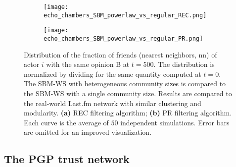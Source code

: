 \documentclass[11 pt , letterpaper , twoside , openright]{book}
\begin{document}
\begin{figure}[H]
  \begin{subfigure}[b]{0.49\textwidth}
    \caption{}
  	\texttt{[image: echo\_chambers\_SBM\_powerlaw\_vs\_regular\_REC.png]}
    \label{pr_pow_single}
  \end{subfigure}
  \begin{subfigure}[b]{0.49\textwidth}
    \caption{}
  	\texttt{[image: echo\_chambers\_SBM\_powerlaw\_vs\_regular\_PR.png]}
    \label{rec_pow_single}
  \end{subfigure}
  \captionsetup{format=plain}
  \caption[Distribution of the fraction of friends (nearest neighbors, nn) of actor $i$ with the same opinion B at $t = 500$. The SBM-WS with heterogeneous community sizes is compared to the SBM-WS with a single community size. Results are compared to the real-world Last.fm network with similar clustering and modularity. Results for the REC and PR filtering algorithms.]{Distribution of the fraction of friends (nearest neighbors, nn) of actor $i$ with the same opinion B at $t = 500$. The distribution is normalized by dividing for the same quantity computed at $t=0$. The SBM-WS with heterogeneous community sizes is compared to the SBM-WS with a single community size. Results are compared to the real-world Last.fm network with similar clustering and modularity. \textbf{(a)} REC filtering algorithm; \textbf{(b)} PR filtering algorithm. Each curve is the average of $50$ independent simulations. Error bars are omitted for an improved visualization.}
\label{power_vs_single}
\end{figure}

\subsection{The PGP trust network}
\end{document}
